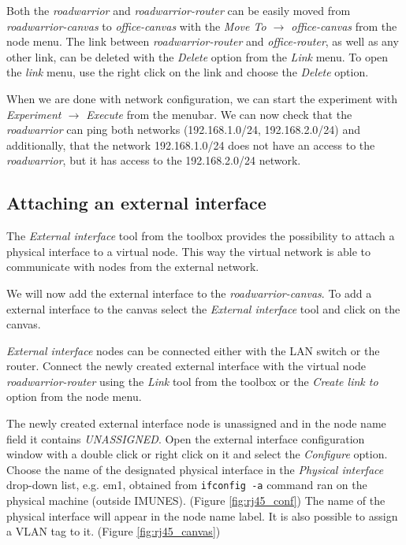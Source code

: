 Both the \emph{roadwarrior} and \emph{roadwarrior-router} can be easily moved
from \emph{roadwarrior-canvas} to \emph{office-canvas} with the \emph{Move To
$\to$ office-canvas} from the node menu. The link between
\emph{roadwarrior-router} and \emph{office-router}, as well as any other link,
can be deleted with the \emph{Delete} option from the \emph{Link} menu. To open
the \emph{link} menu, use the right click on the link and choose the
\emph{Delete} option.

When we are done with network configuration, we can start the experiment with
\emph{Experiment $\to$ Execute} from the menubar. We can now check that the
\emph{roadwarrior} can ping both networks (192.168.1.0/24, 192.168.2.0/24) and
additionally, that the network 192.168.1.0/24 does not have an access to the
\emph{roadwarrior}, but it has access to the 192.168.2.0/24 network.

\subsection{Attaching an external interface}

The \emph{External interface} tool from the toolbox provides the possibility to
attach a physical interface to a virtual node. This way the virtual network is
able to communicate with nodes from the external network.

We will now add the external interface to the \emph{roadwarrior-canvas}. To add
a external interface to the canvas select the \emph{External interface} tool
and click on the canvas.

\emph{External interface} nodes can be connected either with the LAN switch or the
router. Connect the newly created external interface with the virtual node
\emph{roadwarrior-router} using the \emph{Link} tool from the toolbox or the
\emph{Create link to} option from the node menu.

The newly created external interface node is unassigned and in the node name
field it contains \emph{UNASSIGNED}. Open the external interface configuration
window with a double click or right click on it and select the \emph{Configure}
option. Choose the name of the designated physical interface in the
\emph{Physical interface} drop-down list, e.g. em1, obtained from
\texttt{ifconfig -a} command ran on the physical machine (outside IMUNES).
(Figure \ref{fig:rj45_conf}) The name of the physical interface will appear in
the node name label. It is also possible to assign a VLAN tag to it. (Figure
\ref{fig:rj45_canvas})

